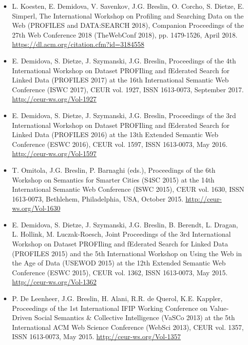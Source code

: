 \documentclass[10pt,a4paper]{res} %
\begin{document}
\begin{resume}
\begin{itemize} \itemsep -2pt
\item L. Koesten, E. Demidova, V. Savenkov, J.G. Breslin, O. Corcho, S. Dietze, E. Simperl, The International Workshop on Profiling and Searching Data on the Web (PROFILES and DATA:SEARCH 2018), Companion Proceedings of the 27th Web Conference 2018 (TheWebConf 2018), pp. 1479-1526, April 2018. \url{https://dl.acm.org/citation.cfm?id=3184558}
\item E. Demidova, S. Dietze, J. Szymanski, J.G. Breslin, Proceedings of the 4th International Workshop on Dataset PROFIling and fEderated Search for Linked Data (PROFILES 2017) at the 16th International Semantic Web Conference (ISWC 2017), CEUR vol. 1927, ISSN 1613-0073, September 2017. \url{http://ceur-ws.org/Vol-1927}
\item E. Demidova, S. Dietze, J. Szymanski, J.G. Breslin, Proceedings of the 3rd International Workshop on Dataset PROFIling and fEderated Search for Linked Data (PROFILES 2016) at the 13th Extended Semantic Web Conference (ESWC 2016), CEUR vol. 1597, ISSN 1613-0073, May 2016. \url{http://ceur-ws.org/Vol-1597}
\item T. Omitola, J.G. Breslin, P. Barnaghi (eds.), Proceedings of the 6th Workshop on Semantics for Smarter Cities (S4SC 2015) at the 14th International Semantic Web Conference (ISWC 2015), CEUR vol. 1630, ISSN 1613-0073, Bethlehem, Philadelphia, USA, October 2015. \url{http://ceur-ws.org/Vol-1630}
\item E. Demidova, S. Dietze, J. Szymanski, J.G. Breslin, B. Berendt, L. Dragan, L. Hollink, M. Luczak-Roesch, Joint Proceedings of the 3rd International Workshop on Dataset PROFIling and fEderated Search for Linked Data (PROFILES 2015) and the 5th International Workshop on Using the Web in the Age of Data (USEWOD 2015) at the 12th Extended Semantic Web Conference (ESWC 2015), CEUR vol. 1362, ISSN 1613-0073, May 2015. \url{http://ceur-ws.org/Vol-1362}
\item P. De Leenheer, J.G. Breslin, H. Alani, R.R. de Querol, K.E. Kappler, Proceedings of the 1st International IFIP Working Conference on Value-Driven Social Semantics \& Collective Intelligence (VaSCo 2013) at the 5th International ACM Web Science Conference (WebSci 2013), CEUR vol. 1357, ISSN 1613-0073, May 2015. \url{http://ceur-ws.org/Vol-1357}

\end{itemize}
\end{resume}
\end{document}
